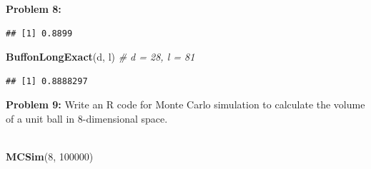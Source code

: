\documentclass[11pt]{article}
\newcommand{\skipline}{\vspace{\baselineskip}}
\newenvironment{problem}[1]{\textbf{Problem #1:}}{\newpage}
\newenvironment{Shaded}{\begin{snugshade}}{\end{snugshade}}
\newcommand{\CommentTok}[1]{\textcolor[rgb]{0.56,0.35,0.01}{\textit{#1}}}
\newcommand{\ControlFlowTok}[1]{\textcolor[rgb]{0.13,0.29,0.53}{\textbf{#1}}}
\newcommand{\DataTypeTok}[1]{\textcolor[rgb]{0.13,0.29,0.53}{#1}}
\newcommand{\DecValTok}[1]{\textcolor[rgb]{0.00,0.00,0.81}{#1}}
\newcommand{\KeywordTok}[1]{\textcolor[rgb]{0.13,0.29,0.53}{\textbf{#1}}}
\newcommand{\NormalTok}[1]{#1}
\newcommand{\OperatorTok}[1]{\textcolor[rgb]{0.81,0.36,0.00}{\textbf{#1}}}
\newcommand{\StringTok}[1]{\textcolor[rgb]{0.31,0.60,0.02}{#1}}
\begin{document}
\begin{problem}{8}
\begin{enumerate}[label = (\alph*)]
\begin{verbatim}
## [1] 0.8899
\end{verbatim}

\begin{Shaded}
\begin{Highlighting}[]
\KeywordTok{BuffonLongExact}\NormalTok{(d, l)} \CommentTok{# d = 28, l = 81}
\end{Highlighting}
\end{Shaded}

\begin{verbatim}
## [1] 0.8888297
\end{verbatim}
		\end{enumerate}
	\end{problem}

	\begin{problem}{9}
		Write an R code for Monte Carlo simulation to calculate the volume of a unit ball in 8-dimensional space.
		\\ \\
\begin{Shaded}
\end{Shaded}
\skipline
\begin{Shaded}
\begin{Highlighting}[]
\KeywordTok{MCSim}\NormalTok{(}\DecValTok{8}\NormalTok{, }\DecValTok{100000}\NormalTok{)}
\end{Highlighting}
\end{Shaded}


\end{problem}
\end{document}
